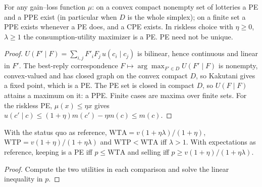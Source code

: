 \begin{theorem}
\label{thm:beh-kr-exist}
\leanok
{}
For any gain--loss function $\mu$: on a convex compact nonempty set of lotteries a PE and a PPE exist (in particular
when $D$ is the whole simplex); on a finite set a PPE exists whenever a PE does, and a CPE exists. In riskless choice
with $\eta\ge0$, $\lambda\ge1$ the consumption-utility maximizer is a PE. PE need not be unique.
\end{theorem}
\begin{proof}
\leanok
$U(F'\mid F)=\sum_{i,j}F'_iF_j\,u(c_i\mid c_j)$ is bilinear, hence continuous and linear in $F'$. The best-reply
correspondence $F\mapsto\arg\max_{F'\in D}U(F'\mid F)$ is nonempty, convex-valued and has closed graph on the
convex compact $D$, so Kakutani gives a fixed point, which is a PE. The PE set is closed in compact $D$, so
$U(F\mid F)$ attains a maximum on it: a PPE. Finite cases are maxima over finite sets. For the riskless PE,
$\mu(x)\le\eta x$ gives $u(c'\mid c)\le(1+\eta)m(c')-\eta m(c)\le m(c)$.
\end{proof}

\begin{theorem}
\label{thm:beh-endowment}
\leanok
{}
With the status quo as reference, $\mathrm{WTA}=v(1+\eta\lambda)/(1+\eta)$, $\mathrm{WTP}=v(1+\eta)/(1+\eta\lambda)$ and
$\mathrm{WTP}<\mathrm{WTA}$ iff $\lambda>1$. With expectations as reference, keeping is a PE iff $p\le\mathrm{WTA}$
and selling iff $p\ge v(1+\eta)/(1+\eta\lambda)$.
\end{theorem}
\begin{proof}
\leanok
Compute the two utilities in each comparison and solve the linear inequality in $p$.
\end{proof}

